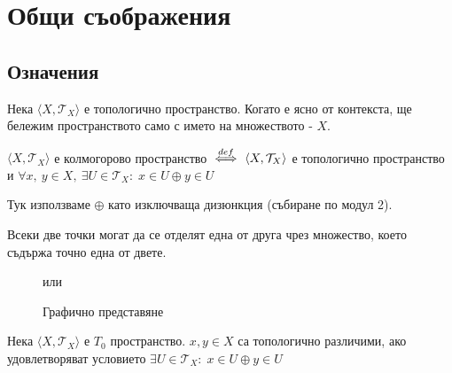 \section{Общи съображения}
\subsection{Означения}
\begin{notation}
    Нека $\langle X, \mathcal T_X\rangle$ е топологично пространство. Когато е ясно от контекста, ще бележим пространството само с името на множеството - $X$.
\end{notation}

\begin{definition}
    $\langle X, \mathcal T_X \rangle$ е колмогорово пространство ${\overset{def}{\iff}}\ \langle X, \mathcal T_X \rangle$ е топологично пространство и $\forall x,\ y \in X,\ \exists U \in \mathcal T_X:\; x \in U \oplus y \in U$

    Тук използваме $\oplus$ като изключваща дизюнкция (събиране по модул 2).

    Всеки две точки могат да се отделят една от друга чрез множество, което съдържа точно една от двете.
    \begin{figure}[H]
        \centering
        или 
        \caption{Графично представяне}
    \end{figure}
\end{definition}
\begin{definition}
    Нека $\langle X, \mathcal T_X \rangle$ е $T_0$ пространство. $x, y \in X$ са топологично различими, ако удовлетворяват условието $\exists U \in \mathcal T_X:\; x \in U \oplus y \in U$
\end{definition}

